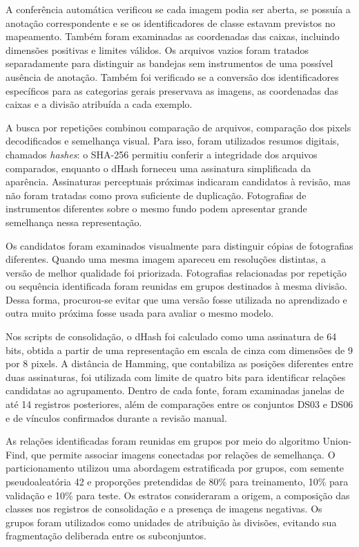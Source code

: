 A conferência automática verificou se cada imagem podia ser aberta, se possuía a anotação correspondente e se os identificadores de classe estavam previstos no mapeamento. Também foram examinadas as coordenadas das caixas, incluindo dimensões positivas e limites válidos. Os arquivos vazios foram tratados separadamente para distinguir as bandejas sem instrumentos de uma possível ausência de anotação. Também foi verificado se a conversão dos identificadores específicos para as categorias gerais preservava as imagens, as coordenadas das caixas e a divisão atribuída a cada exemplo.

A busca por repetições combinou comparação de arquivos, comparação dos pixels decodificados e semelhança visual. Para isso, foram utilizados resumos digitais, chamados \textit{hashes}: o SHA-256 permitiu conferir a integridade dos arquivos comparados, enquanto o dHash forneceu uma assinatura simplificada da aparência. Assinaturas perceptuais próximas indicaram candidatos à revisão, mas não foram tratadas como prova suficiente de duplicação. Fotografias de instrumentos diferentes sobre o mesmo fundo podem apresentar grande semelhança nessa representação.

Os candidatos foram examinados visualmente para distinguir cópias de fotografias diferentes. Quando uma mesma imagem apareceu em resoluções distintas, a versão de melhor qualidade foi priorizada. Fotografias relacionadas por repetição ou sequência identificada foram reunidas em grupos destinados à mesma divisão. Dessa forma, procurou-se evitar que uma versão fosse utilizada no aprendizado e outra muito próxima fosse usada para avaliar o mesmo modelo.

Nos scripts de consolidação, o dHash foi calculado como uma assinatura de 64 bits, obtida a partir de uma representação em escala de cinza com dimensões de 9 por 8 pixels. A distância de Hamming, que contabiliza as posições diferentes entre duas assinaturas, foi utilizada com limite de quatro bits para identificar relações candidatas ao agrupamento. Dentro de cada fonte, foram examinadas janelas de até 14 registros posteriores, além de comparações entre os conjuntos DS03 e DS06 e de vínculos confirmados durante a revisão manual.

As relações identificadas foram reunidas em grupos por meio do algoritmo Union-Find, que permite associar imagens conectadas por relações de semelhança. O particionamento utilizou uma abordagem estratificada por grupos, com semente pseudoaleatória 42 e proporções pretendidas de 80\% para treinamento, 10\% para validação e 10\% para teste. Os estratos consideraram a origem, a composição das classes nos registros de consolidação e a presença de imagens negativas. Os grupos foram utilizados como unidades de atribuição às divisões, evitando sua fragmentação deliberada entre os subconjuntos.

